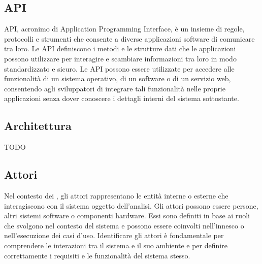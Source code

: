 \vspace{2em}
\subsection*{API}
API, acronimo di Application Programming Interface, è un insieme di regole, protocolli e strumenti che consente a diverse applicazioni software di comunicare tra loro. Le API definiscono i metodi e le strutture dati che le applicazioni possono utilizzare per interagire e scambiare informazioni tra loro in modo standardizzato e sicuro. Le API possono essere utilizzate per accedere alle funzionalità di un sistema operativo, di un software o di un servizio web, consentendo agli sviluppatori di integrare tali funzionalità nelle proprie applicazioni senza dover conoscere i dettagli interni del sistema sottostante.

\vspace{2em}
\subsection*{Architettura}
TODO

\vspace{2em}
\subsection*{Attori}
Nel contesto dei , gli attori rappresentano le entità interne o esterne che interagiscono con il sistema oggetto dell'analisi. Gli attori possono essere persone, altri sistemi software o componenti hardware. Essi sono definiti in base ai ruoli che svolgono nel contesto del sistema e possono essere coinvolti nell'innesco o nell'esecuzione dei casi d'uso. Identificare gli attori è fondamentale per comprendere le interazioni tra il sistema e il suo ambiente e per definire correttamente i requisiti e le funzionalità del sistema stesso.
